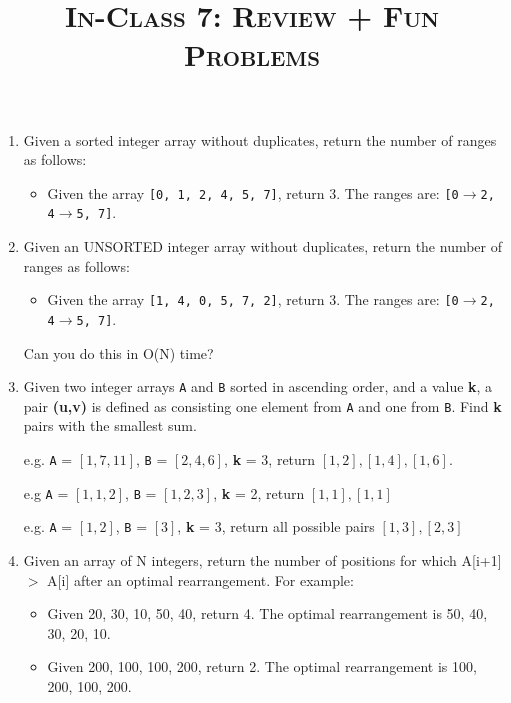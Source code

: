 \documentclass{article}
\title{\large{\textsc{In-Class 7: Review + Fun Problems}}}
\date{}
\begin{document}
\maketitle

\begin{enumerate}


\item Given a sorted integer array without duplicates, return the number of ranges as follows:

\begin{itemize}
    \item Given the array \texttt{[0, 1, 2, 4, 5, 7]}, return 3. The ranges are: \texttt{[0$\rightarrow$2, 4$\rightarrow$5, 7]}.
\end{itemize}

\item Given an UNSORTED integer array without duplicates, return the number of ranges as follows:

\begin{itemize}
    \item Given the array \texttt{[1, 4, 0, 5, 7, 2]}, return 3. The ranges are: \texttt{[0$\rightarrow$2, 4$\rightarrow$5, 7]}.
\end{itemize}
Can you do this in O(N) time?



\item Given two integer arrays \texttt{A} and \texttt{B} sorted in ascending order, and a value \textbf{k}, a pair \textbf{(u,v)} is defined as consisting one element from \texttt{A} and one from \texttt{B}. Find \textbf{k} pairs with the smallest sum.

e.g. \texttt{A} = $[1,7,11]$, \texttt{B} = $[2,4,6]$, \textbf{k} = 3, return $[1,2], [1,4], [1,6]$.

e.g \texttt{A} = $[1,1,2]$, \texttt{B} = $[1,2,3]$, \textbf{k} = 2, return $[1,1], [1,1]$

e.g. \texttt{A} = $[1,2]$, \texttt{B} = $[3]$, \textbf{k} = 3, return all possible pairs $[1,3], [2,3]$


\item Given an array of N integers, return the number of positions for which A[i+1] $>$ A[i] after an optimal rearrangement. For example:
\begin{itemize}
\item Given {20, 30, 10, 50, 40}, return 4. The optimal rearrangement is {50, 40, 30, 20, 10}.
\item Given {200, 100, 100, 200}, return 2. The optimal rearrangement is {100, 200, 100, 200}.
\end{itemize}


\end{enumerate}
\end{document}
